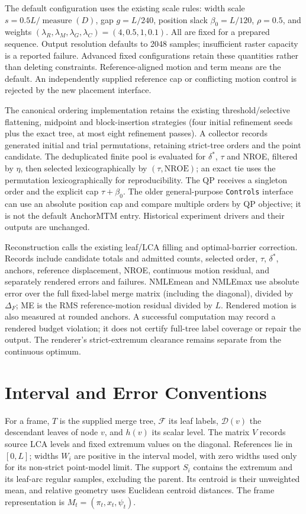 \documentclass[10pt]{article}
\begin{document}
The default configuration uses the existing scale rules: width scale $s=0.5L/\operatorname{measure}(D)$, gap $g=L/240$, position slack $\beta_0=L/120$, $\rho=0.5$, and weights $(\lambda_R,\lambda_M,\lambda_G,\lambda_C)=(4,0.5,1,0.1)$. All are fixed for a prepared sequence. Output resolution defaults to 2048 samples; insufficient raster capacity is a reported failure. Advanced fixed configurations retain these quantities rather than deleting constraints. Reference-aligned motion and term means are the default. An independently supplied reference cap or conflicting motion control is rejected by the new placement interface.

The canonical ordering implementation retains the existing threshold/selective flattening, midpoint and block-insertion strategies (four initial refinement seeds plus the exact tree, at most eight refinement passes). A collector records generated initial and trial permutations, retaining strict-tree orders and the point candidate. The deduplicated finite pool is evaluated for $\delta^*$, $\tau$ and NROE, filtered by $\eta$, then selected lexicographically by $(\tau,\mathrm{NROE})$; an exact tie uses the permutation lexicographically for reproducibility. The QP receives a singleton order and the explicit cap $\tau+\beta_0$. The older general-purpose \texttt{Controls} interface can use an absolute position cap and compare multiple orders by QP objective; it is not the default AnchorMTM entry. Historical experiment drivers and their outputs are unchanged.

Reconstruction calls the existing leaf/LCA filling and optimal-barrier correction. Records include candidate totals and admitted counts, selected order, $\tau$, $\delta^*$, anchors, reference displacement, NROE, continuous motion residual, and separately rendered errors and failures. NMLEmean and NMLEmax use absolute error over the full fixed-label merge matrix (including the diagonal), divided by $\Delta_F$; ME is the RMS reference-motion residual divided by $L$. Rendered motion is also measured at rounded anchors. A successful computation may record a rendered budget violation; it does not certify full-tree label coverage or repair the output. The renderer's strict-extremum clearance remains separate from the continuous optimum.

\section{Interval and Error Conventions}\label{sec:interval}
For a frame, $T$ is the supplied merge tree, $\mathcal{F}$ its leaf labels, $\mathcal{D}(v)$ the descendant leaves of node $v$, and $h(v)$ its scalar level. The matrix $V$ records source LCA levels and fixed extremum values on the diagonal. References lie in $[0,L]$; widths $W_i$ are positive in the interval model, with zero widths used only for its non-strict point-model limit. The support $S_i$ contains the extremum and its leaf-arc regular samples, excluding the parent. Its centroid is their unweighted mean, and relative geometry uses Euclidean centroid distances. The frame representation is $M_t=(\pi_t,x_t,\psi_t)$.
\end{document}
